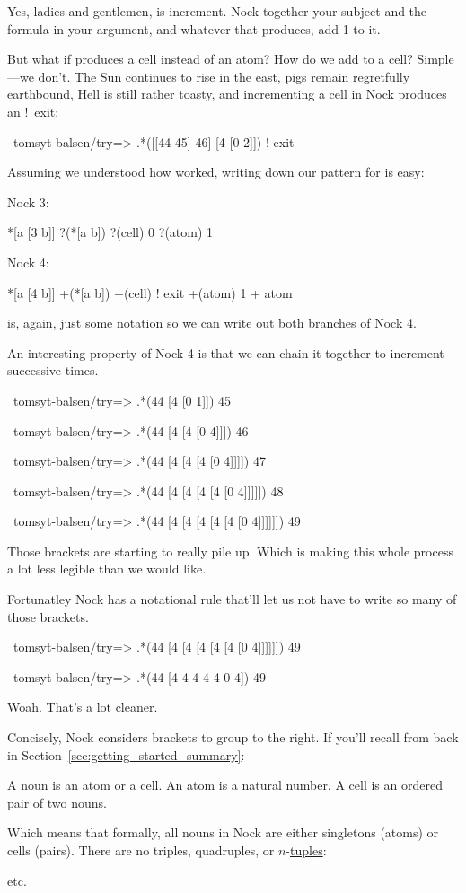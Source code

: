 Yes, ladies and gentlemen,  is increment. Nock together your subject and the formula in your argument,
and whatever that produces, add 1 to it.

But what if  produces a cell instead of an atom? How do we
add  to a cell? Simple---we don't. The Sun continues to rise in the east,
pigs remain regretfully earthbound, Hell is still rather toasty, and
incrementing a cell in Nock produces an !\ exit:
\begin{code}
~tomsyt-balsen/try=> .*([[44 45] 46] [4 [0 2]])
! exit
\end{code}
Assuming we understood how  worked, writing down our pattern for  is easy:

Nock 3:
\begin{code}
*[a [3 b]]         ?(*[a b])
?(cell)            0
?(atom)            1
\end{code}
Nock 4:
\begin{code}
*[a [4 b]]         +(*[a b])
+(cell)            ! exit
+(atom)            1 + atom
\end{code}
 is, again, just some notation so we can write out both branches of Nock
4.

An interesting property of Nock 4 is that  we can chain it together to
increment successive times.
\begin{code}
~tomsyt-balsen/try=> .*(44 [4 [0 1]])
45

~tomsyt-balsen/try=> .*(44 [4 [4 [0 4]]])
46

~tomsyt-balsen/try=> .*(44 [4 [4 [4 [0 4]]]])
47

~tomsyt-balsen/try=> .*(44 [4 [4 [4 [4 [0 4]]]]])
48

~tomsyt-balsen/try=> .*(44 [4 [4 [4 [4 [4 [0 4]]]]]])
49
\end{code}
Those brackets are starting to really pile up. Which is making this whole
process a lot less legible than we would like.

Fortunatley Nock has a notational rule that'll let us not have to write so many
of those brackets.
\begin{code}
~tomsyt-balsen/try=> .*(44 [4 [4 [4 [4 [4 [0 4]]]]]])
49

~tomsyt-balsen/try=> .*(44 [4 4 4 4 4 0 4])
49
\end{code}
Woah. That's a lot cleaner.

Concisely, Nock considers brackets to group to the right. If you'll recall from back in Section~\ref{sec:getting_started_summary}:
\begin{code}
A noun is an atom or a cell.
An atom is a natural number.
A cell is an ordered pair of two nouns.
\end{code}
Which means that formally, all nouns in Nock are either singletons (atoms) or
cells (pairs). There are no triples, quadruples, or \(n\)-\href{https://en.wikipedia.org/wiki/Tuple}{tuples}:
\begin{code}
[a b c]
[a b c d]
[a b c d e]
\end{code}
etc.

